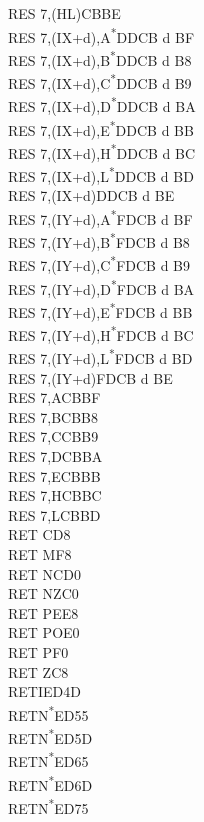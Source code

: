 \documentclass[twoside,openright,a4paper]{book}
\begin{document}
\begin{multicols}{3}
{\begin{tabbing}
	RES 7,(HL)\>CBBE\\
	RES 7,(IX+d),A\textsuperscript{*}\>DDCB d BF\\
	RES 7,(IX+d),B\textsuperscript{*}\>DDCB d B8\\
	RES 7,(IX+d),C\textsuperscript{*}\>DDCB d B9\\
	RES 7,(IX+d),D\textsuperscript{*}\>DDCB d BA\\
	RES 7,(IX+d),E\textsuperscript{*}\>DDCB d BB\\
	RES 7,(IX+d),H\textsuperscript{*}\>DDCB d BC\\
	RES 7,(IX+d),L\textsuperscript{*}\>DDCB d BD\\
	RES 7,(IX+d)\>DDCB d BE\\
	RES 7,(IY+d),A\textsuperscript{*}\>FDCB d BF\\
	RES 7,(IY+d),B\textsuperscript{*}\>FDCB d B8\\
	RES 7,(IY+d),C\textsuperscript{*}\>FDCB d B9\\
	RES 7,(IY+d),D\textsuperscript{*}\>FDCB d BA\\
	RES 7,(IY+d),E\textsuperscript{*}\>FDCB d BB\\
	RES 7,(IY+d),H\textsuperscript{*}\>FDCB d BC\\
	RES 7,(IY+d),L\textsuperscript{*}\>FDCB d BD\\
	RES 7,(IY+d)\>FDCB d BE\\
	RES 7,A\>CBBF\\
	RES 7,B\>CBB8\\
	RES 7,C\>CBB9\\
	RES 7,D\>CBBA\\
	RES 7,E\>CBBB\\
	RES 7,H\>CBBC\\
	RES 7,L\>CBBD\\
	RET C\>D8\\
	RET M\>F8\\
	RET NC\>D0\\
	RET NZ\>C0\\
	RET PE\>E8\\
	RET PO\>E0\\
	RET P\>F0\\
	RET Z\>C8\\
	RETI\>ED4D\\
	RETN\textsuperscript{*}\>ED55\\
	RETN\textsuperscript{*}\>ED5D\\
	RETN\textsuperscript{*}\>ED65\\
	RETN\textsuperscript{*}\>ED6D\\
	RETN\textsuperscript{*}\>ED75\\

\end{tabbing}}
\end{multicols}
\end{document}
